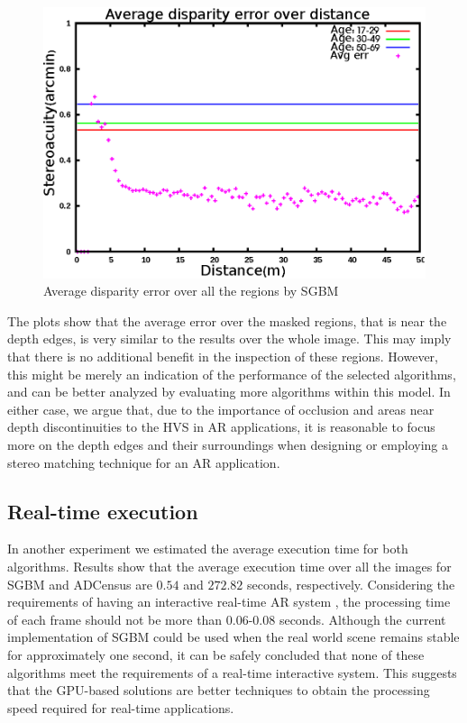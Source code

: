 \begin{figure}[H]
\centering
\includegraphics[scale=0.8]{sgbmfull3}
\caption{Average disparity error over all the regions by SGBM}
\label{fig:sgbmfull3}
\end{figure} 

The plots show that the average error over the masked regions, that is near the depth edges, is very similar to the results over the whole image. 
This may imply that there is no additional benefit in the inspection of these regions. 
However, this might be merely an indication of the performance of the selected algorithms, and can be better analyzed by evaluating more algorithms within this model.
In either case, we argue that, due to the importance of occlusion and areas near depth discontinuities to the HVS in AR applications, 
it is reasonable to focus more on the depth edges and their surroundings when designing or employing a stereo matching technique for an AR application.

\subsection{Real-time execution}
In another experiment we estimated the average execution time for both algorithms. Results show that the average execution time over all the images 
for SGBM and ADCensus are $0.54$ and $272.82$ seconds, respectively.
Considering the requirements of having an interactive real-time AR system \cite{hertz00}, the processing time of each frame should not be more than 0.06-0.08 seconds.
Although the current implementation of SGBM could be used when the real world scene remains stable for approximately one second, it can be safely concluded that
none of these algorithms meet the requirements of a real-time interactive system.
This suggests that the GPU-based solutions are better techniques to obtain the processing speed required for real-time applications.

